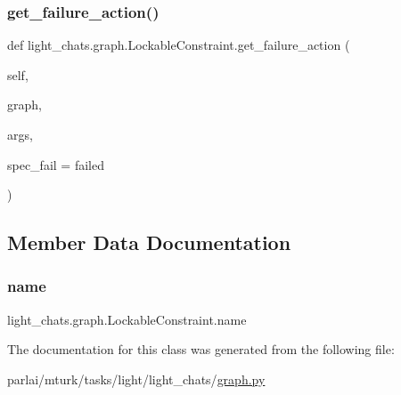 \subsubsection{\texorpdfstring{get\+\_\+failure\+\_\+action()}{get\_failure\_action()}}
{\footnotesize\ttfamily def light\+\_\+chats.\+graph.\+Lockable\+Constraint.\+get\+\_\+failure\+\_\+action (\begin{DoxyParamCaption}\item[{}]{self,  }\item[{}]{graph,  }\item[{}]{args,  }\item[{}]{spec\+\_\+fail = {\ttfamily \textquotesingle{}failed\textquotesingle{}} }\end{DoxyParamCaption})}



\subsection{Member Data Documentation}
\mbox{\label{classlight__chats_1_1graph_1_1LockableConstraint_a9de4ab5a0b0434496da7971c7c015054}} 
\subsubsection{\texorpdfstring{name}{name}}
{\footnotesize\ttfamily light\+\_\+chats.\+graph.\+Lockable\+Constraint.\+name\hspace{0.3cm}{\ttfamily [static]}}



The documentation for this class was generated from the following file\+:\begin{DoxyCompactItemize}
\item 
parlai/mturk/tasks/light/light\+\_\+chats/\hyperlink{parlai_2mturk_2tasks_2light_2light__chats_2graph_8py}{graph.\+py}\end{DoxyCompactItemize}

